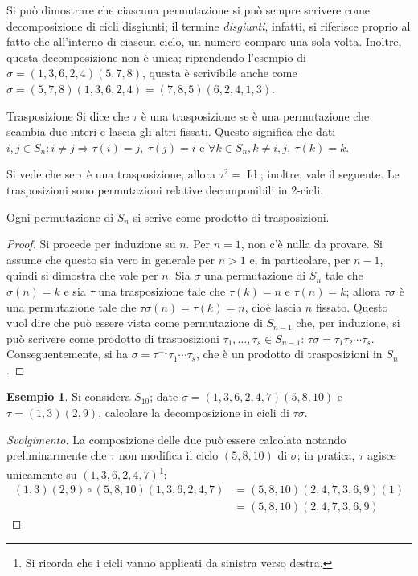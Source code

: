 \documentclass[11pt, a4paper]{scrartcl}
\newenvironment{svolgimento}{\renewcommand\qedsymbol{$\blacksquare$}\begin{proof}[Svolgimento]}{\end{proof}}
\theoremstyle{definition}
\newtheorem{esempio}{Esempio}
\numberwithin{esempio}{section}
\theoremstyle{definition}
\numberwithin{obs}{section}
\numberwithin{nota}{section}
\numberwithin{equation}{subsection}
\begin{document}
Si pu\`o dimostrare che ciascuna permutazione si pu\`o sempre scrivere come decomposizione di cicli disgiunti; il termine \textit{disgiunti}, infatti, si riferisce proprio al fatto che all'interno di ciascun ciclo, un numero compare una sola volta.
Inoltre, questa decomposizione non \`e unica; riprendendo l'esempio di $\sigma  = (1,3,6,2,4)(5,7,8)$, questa \`e scrivibile anche come $\sigma  = (5,7,8) (1,3,6,2,4) = (7,8,5)(6,2,4,1,3)$.
\begin{definizione}
	{Trasposizione}{}
	Si dice che $\tau $ \`e una trasposizione se \`e una permutazione che scambia due interi e lascia gli altri fissati.
	Questo significa che dati $i,j \in S_n : i\neq j \Rightarrow \tau (i) = j, \ \tau (j) = i$ e $\forall k \in S_n, k\neq i,j, \ \tau (k)= k $.
\end{definizione}
Si vede che se $\tau $ \`e una trasposizione, allora $\tau ^2 = \operatorname{Id} $; inoltre, vale il seguente.
Le trasposizioni sono permutazioni relative decomponibili in 2-cicli.
\begin{teorema}
	{}{}
	Ogni permutazione di $S_n$ si scrive come prodotto di trasposizioni.
	\begin{proof}
		Si procede per induzione su $n$.
		Per $n=1$, non c'\`e nulla da provare. 
		Si assume che questo sia vero in generale per $n>1$ e, in particolare, per $n-1$, quindi si dimostra che vale per $n$.
		Sia $\sigma $ una permutazione di $S_n$ tale che $\sigma (n) = k$ e sia $\tau $ una trasposizione tale che $\tau (k) = n$ e $\tau (n) = k $; allora $\tau \sigma $ \`e una permutazione tale che $\tau \sigma (n) = \tau (k) = n$, cio\`e lascia $n$ fissato.
		Questo vuol dire che pu\`o essere vista come permutazione di $S_{n-1} $ che, per induzione, si pu\`o scrivere come prodotto di trasposizioni $\tau _1, \ldots, \tau _s \in S_{n-1} $: $\tau \sigma = \tau _1 \tau _2 \cdots \tau _s$.
		Conseguentemente, si ha $\sigma  = \tau ^{-1} \tau _1 \cdots \tau _s$, che \`e un prodotto di trasposizioni in $S_n$.
	\end{proof}
\end{teorema}
\begin{esempio}
	Si considera $S_{10}$; date $\sigma = (1,3,6,2,4,7)(5,8,10)$ e $\tau  = (1,3)(2,9)$, calcolare la decomposizione in cicli di $\tau \sigma $.
	\begin{svolgimento}
		La composizione delle due pu\`o essere calcolata notando preliminarmente che $\tau $ non modifica il ciclo $(5,8,10)$ di $\sigma $; in pratica, $\tau $ agisce unicamente su $(1,3,6,2,4,7)$\footnote{Si ricorda che i cicli vanno applicati da sinistra verso destra.}:
		\[
			\begin{split}
				(1,3)(2,9)\circ (5,8,10)(1,3,6,2,4,7)&=(5,8,10)(2,4,7,3,6,9)(1) \\
				&=(5,8,10)(2,4,7,3,6,9)
			\end{split}
		\] 
	\end{svolgimento}
\end{esempio}
\end{document}
